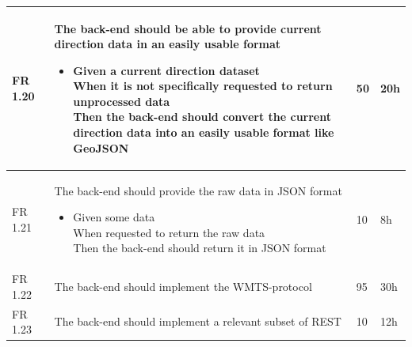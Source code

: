 \documentclass[11pt,a4paper,titlepage,oneside]{report}
\begin{document}
\begin{longtable}{p{1.4cm} p{7.8cm} p{1cm} p{1cm} }
  FR 1.20 & The \gls{back-end} should be able to provide current direction data in an easily usable format
  \begin{itemize}
  \item \parbox[t]{6.8cm}{
        Given a current direction dataset \\
        When it is not specifically requested to return unprocessed data \\
        Then the \gls{back-end} should convert the current direction data into an easily usable format like GeoJSON}
  \end{itemize}
  & 50 & 20h \\ \hline

  FR 1.21 & The \gls{back-end} should provide the raw data in \gls{JSON} format
  \begin{itemize}
  \item \parbox[t]{6.8cm}{
        Given some data \\
        When requested to return the raw data \\
        Then the \gls{back-end} should return it in \gls{JSON} format}
  \end{itemize}
  & 10 & 8h \\ \hline

  FR 1.22 & The \gls{back-end} should implement the \gls{WMTS}-\gls{protocol} & 95 & 30h \\ \hline

  FR 1.23 & The \gls{back-end} should implement a relevant subset of REST & 10 & 12h \\ \hline
  \end{longtable}
  
  \vspace{2cm}
\end{document}
